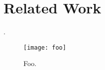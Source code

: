 \section{Related Work}
\label{sec:related_work}

\cite{lavalle2006planning,rehder2017pedestrian}.

\begin{figure}[h]

\texttt{[image: foo]}
\caption{Foo.}
\label{fig:foo}

\end{figure}

\lipsum[1-4]
